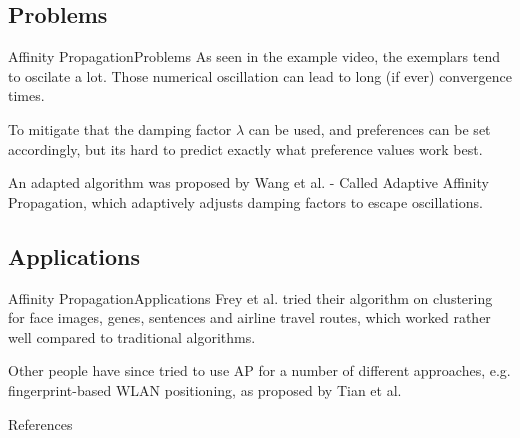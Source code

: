 \documentclass{beamer}
\begin{document}
\subsection{Problems}
\begin{frame}{Affinity Propagation}{Problems}
	As seen in the example video, the exemplars tend to oscilate a lot. Those numerical oscillation can lead to long (if ever) convergence times. \cite{frey2007clustering} 
	
	To mitigate that the damping factor $\lambda$ can be used, and preferences can be set accordingly, but its hard to predict exactly what preference values work best. \cite{wang2008adaptive}
	
	An adapted algorithm was proposed by Wang et al. - Called Adaptive Affinity Propagation, which adaptively adjusts damping factors to escape oscillations. \cite{wang2008adaptive}
\end{frame}

\subsection{Applications}
\begin{frame}{Affinity Propagation}{Applications}
	Frey et al. tried their algorithm on clustering for face images, genes, sentences and airline travel routes, which worked rather well compared to traditional algorithms. \cite{frey2007clustering}
	
	Other people have since tried to use AP for a number of different approaches, e.g. fingerprint-based WLAN positioning, as proposed by Tian et al. \cite{tian2013fingerprint}
\end{frame}

\begin{frame}{References}
	
\end{frame}
\end{document}
